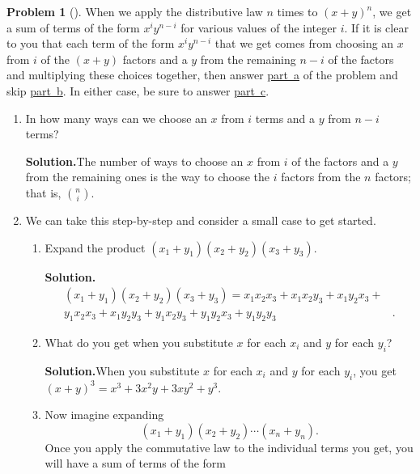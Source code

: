 \documentclass[10pt,]{book}
\theoremstyle{plain}
\theoremstyle{definition}
\newtheorem{activity}[project]{Problem}
\theoremstyle{definition}
\numberwithin{equation}{chapter}
\begin{document}
\begin{activity}[]\label{activity-54}
When we apply the distributive law \(n\) times to \((x+y)^n\), we get a sum of terms of the form \(x^iy^{n-i}\) for various values of the integer \(i\). If it is clear to you that each term of the form \(x^iy^{n-i}\) that we get comes from choosing an \(x\) from \(i\) of the \((x+y)\) factors and a \(y\) from the remaining \(n-i\) of the factors and multiplying these choices together, then answer \hyperref[bin-thm-short]{part~a} of the problem and skip \hyperref[bin-thm-long]{part~b}. In either case, be sure to answer \hyperref[bin-thm-concl]{part~c}.%
\begin{enumerate}[font=\bfseries,label=(\alph*),ref=\alph*]
\item\label{bin-thm-short} In how many ways can we choose an \(x\) from \(i\) terms and a \(y\) from \(n-i\) terms?%
\par\medskip\noindent%
\textbf{Solution.}\quad The number of ways to choose an \(x\) from \(i\) of the factors and a \(y\) from the remaining ones is the way to choose the \(i\) factors from the \(n\) factors; that is, \(\binom{n}{i}\).%
\item\label{bin-thm-long} We can take this step-by-step and consider a small case to get started.%
\begin{enumerate}[font=\bfseries,label=(\roman*),ref=\theenumi.\roman*]
\item\label{task-63} Expand the product \((x_1 +y_1)(x_2 +y_2)(x_3+y_3)\).%
\par\medskip\noindent%
\textbf{Solution.}\quad %
\begin{align*}
(x_1+y_1)(x_2+y_2)(x_3+y_3)=x_1x_2x_3 + \!\!x_1x_2y_3+x_1y_2x_3+&\\
y_1x_2x_3+x_1y_2y_3+y_1x_2y_3 + y_1y_2x_3+y_1y_2y_3&\text{.}
\end{align*}
%
\item\label{task-64} What do you get when you substitute \(x\) for each \(x_i\) and \(y\) for each \(y_i\)?%
\par\medskip\noindent%
\textbf{Solution.}\quad When you substitute \(x\) for each \(x_i\) and \(y\) for each \(y_i\), you get \((x+y)^3=x^3+3x^2y+3xy^2+y^3\).%
\item\label{task-65} Now imagine expanding%
\begin{equation*}
(x_1+y_1)(x_2+y_2)\cdots (x_n+y_n).
\end{equation*}
Once you apply the commutative law to the individual terms you get, you will have a sum of terms of the form%

\end{enumerate}
\end{enumerate}
\end{activity}
\end{document}
